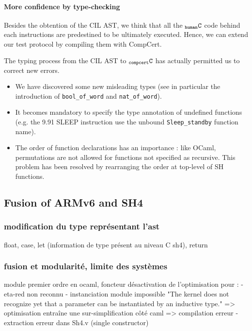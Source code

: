\documentclass[a4paper, 11pt]{article}
\newcommand{\C}{$_{\tt compcert}{\tt C}$\xspace}
\newcommand{\hC}{$_{\tt human}{\tt C}$\xspace}
\begin{document}
    \paragraph{More confidence by type-checking}
Besides the obtention of the CIL AST, we think that all the \hC code behind each instructions are predestined to be ultimately executed. Hence, we can extend our test protocol by compiling them with CompCert.

The typing process from the CIL AST to \C has actually permitted us to correct new errors.
\begin{itemize}
\item We have discovered some new misleading types (see in particular the introduction of \verb|bool_of_word| and \verb|nat_of_word|).
\item It becomes mandatory to specify the type annotation of undefined functions (e.g. the 9.91 SLEEP instruction use the unbound \verb|Sleep_standby| function name). 
\item The order of function declarations has an importance : like OCaml, permutations are not allowed for functions not specified as recursive. This problem has been resolved by rearranging the order at top-level of SH functions.

\end{itemize}


  \subsection{Fusion of ARMv6 and SH4}
    \subsubsection{modification du type représentant l'ast} 
    float, case, let (information de type présent au niveau C sh4), return
    \subsubsection{fusion et modularité, limite des systèmes}
    module premier ordre en ocaml, foncteur
    désactivation de l'optimisation pour :
      - eta-red non reconnu
      - instanciation module impossible "The kernel does not recognize yet that a parameter can be instantiated by an inductive type." => optimisation entraîne une sur-simplification côté caml => compilation erreur 
      - extraction erreur dans Sh4.v (single constructor)
      
\end{document}
